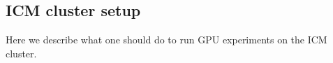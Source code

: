 \begin{appendices}
  \chapter{ICM cluster setup}
  Here we describe what one should do to run GPU experiments on the ICM cluster.
\end{appendices}

